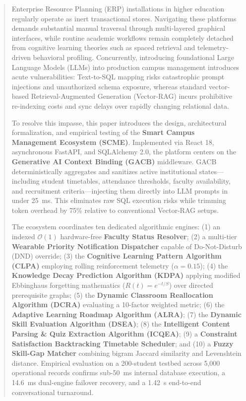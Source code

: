 \documentclass[conference]{IEEEtran}
\begin{document}
\begin{abstract}
Enterprise Resource Planning (ERP) installations in higher education regularly operate as inert transactional stores. Navigating these platforms demands substantial manual traversal through multi-layered graphical interfaces, while routine academic workflows remain completely detached from cognitive learning theories such as spaced retrieval and telemetry-driven behavioral profiling. Concurrently, introducing foundational Large Language Models (LLMs) into production campus management introduces acute vulnerabilities: Text-to-SQL mapping risks catastrophic prompt injections and unauthorized schema exposure, whereas standard vector-based Retrieval-Augmented Generation (Vector-RAG) incurs prohibitive re-indexing costs and sync delays over rapidly changing relational data.

To resolve this impasse, this paper introduces the design, architectural formalization, and empirical testing of the \textbf{Smart Campus Management Ecosystem (SCME)}. Implemented via React 18, asynchronous FastAPI, and SQLAlchemy 2.0, the platform centers on the \textbf{Generative AI Context Binding (GACB)} middleware. GACB deterministically aggregates and sanitizes active institutional states---including student timetables, attendance thresholds, faculty availability, and recruitment criteria---injecting them directly into LLM prompts in under 25~ms. This eliminates raw SQL execution risks while trimming token overhead by 75\% relative to conventional Vector-RAG setups.

The ecosystem coordinates ten dedicated algorithmic engines: (1) an indexed $\mathcal{O}(1)$ hardware-free \textbf{Faculty Status Resolver}; (2) a multi-tier \textbf{Wearable Priority Notification Dispatcher} capable of Do-Not-Disturb (DND) override; (3) the \textbf{Cognitive Learning Pattern Algorithm (CLPA)} employing rolling reinforcement telemetry ($\alpha = 0.15$); (4) the \textbf{Knowledge Decay Prediction Algorithm (KDPA)} applying modified Ebbinghaus forgetting mathematics ($R(t) = e^{-t/S}$) over directed prerequisite graphs; (5) the \textbf{Dynamic Classroom Reallocation Algorithm (DCRA)} evaluating a 10-factor weighted metric; (6) the \textbf{Adaptive Learning Roadmap Algorithm (ALRA)}; (7) the \textbf{Dynamic Skill Evaluation Algorithm (DSEA)}; (8) the \textbf{Intelligent Content Parsing \& Quiz Extraction Algorithm (ICQEA)}; (9) a \textbf{Constraint Satisfaction Backtracking Timetable Scheduler}; and (10) a \textbf{Fuzzy Skill-Gap Matcher} combining bigram Jaccard similarity and Levenshtein distance. Empirical evaluation on a 200-student testbed across 5,000 operational records confirms sub-50~ms internal database execution, a 14.6~ms dual-engine failover recovery, and a 1.42~s end-to-end conversational turnaround.
\end{abstract}
\end{document}
